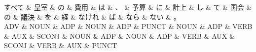 \documentclass[tikz,border=5pt]{standalone}
\begin{document}
\normalsize
\begin{dependency}[edge unit distance=12.0pt]
    \begin{deptext}[column sep=1em]
        すべて \& 皇室 \& の \& 費用 \& は \& 、 \& 予算 \& に \& 計上 \& し \& て \& 国会 \& の \& 議決 \& を \& 経 \& なけれ \& ば \& なら \& ない \& 。\\
        ADV \& NOUN \& ADP \& NOUN \& ADP \& PUNCT \& NOUN \& ADP \& VERB \& AUX \& SCONJ \& NOUN \& ADP \& NOUN \& ADP \& VERB \& AUX \& SCONJ \& VERB \& AUX \& PUNCT\\
    \end{deptext}
\end{dependency}
\end{document}
